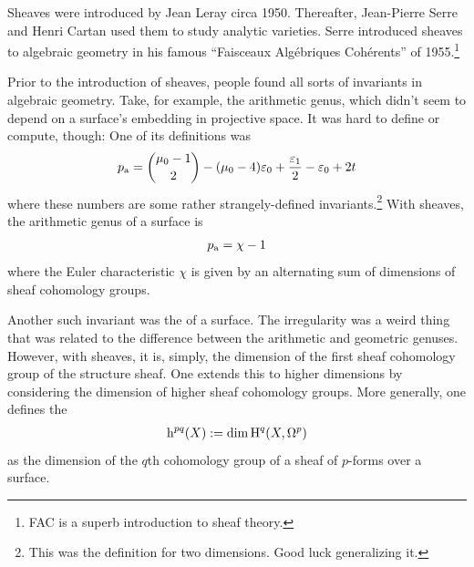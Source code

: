 \documentclass [11 pt, oneside] {article}
\begin{document}
Sheaves were introduced by Jean Leray circa 1950. Thereafter, Jean-Pierre Serre and Henri Cartan used them to study analytic varieties. Serre introduced sheaves to algebraic geometry in his famous ``Faisceaux Algébriques Cohérents'' of 1955.\footnote{FAC is a superb introduction to sheaf theory.}

Prior to the introduction of sheaves, people found all sorts of invariants in algebraic geometry. Take, for example, the arithmetic genus, which didn't seem to depend on a surface's embedding in projective space. It was hard to define or compute, though: One of its definitions was
\begin{align*}
	p_{\textup {a}} = \binom{\mu_0-1}{2} - (\mu_0 - 4) \varepsilon_0 + \frac{\varepsilon_1}{2} - \varepsilon_0+2t
\end{align*}
where these numbers are some rather strangely-defined invariants.\footnote{This was the definition for two dimensions. Good luck generalizing it.} With sheaves, the arithmetic genus of a surface is
\begin{align*}
	p_{\textup {a}} = \chi -1
\end{align*}
where the Euler characteristic $\chi$ is given by an alternating sum of dimensions of sheaf cohomology groups.

Another such invariant was the  of a surface. The irregularity was a weird thing that was related to the difference between the arithmetic and geometric genuses. However, with sheaves, it is, simply, the dimension of the first sheaf cohomology group of the structure sheaf. One extends this to higher dimensions by considering the dimension of higher sheaf cohomology groups. More generally, one defines the  
\begin{align*}
	{\operatorname{h}}^{pq}(X) := \dim \operatorname{H}^q(X,\Omega^p) 
\end{align*}
as the dimension of the $q$th cohomology group of a sheaf of $p$-forms over a surface.
\end{document}
